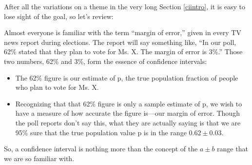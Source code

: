 After all the variations on a theme in the very long Section
\ref{ciintro}, it is easy to lose sight of the goal, so let's review:

Almost everyone is familiar with the term ``margin of error,'' given in
every TV news report during elections.  The report will say something
like, ``In our poll, 62\% stated that they plan to vote for Ms. X.  The
margin of error is 3\%.''  Those two numbers, 62\% and 3\%, form the
essence of confidence intervals:

\begin{itemize}

\item The 62\% figure is our estimate of p, the true population fraction
of people who plan to vote for Ms. X.

\item Recognizing that that 62\% figure is only a sample estimate of p,
we wish to have a measure of how accurate the figure is---our margin of
error.  Though the poll reports don't say this, what they are actually
saying is that we are 95\% sure that the true population value p is in
the range $0.62 \pm 0.03$.

\end{itemize}

So, a confidence interval is nothing more than the concept of the
$a \pm b$ range that we are so familiar with.

